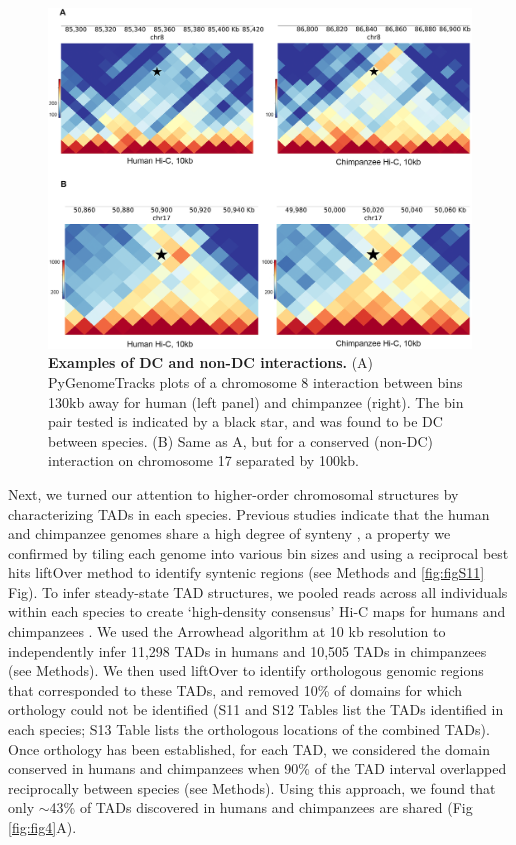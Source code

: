 \begin{figure}
\centering
\includegraphics[width=6in]{img/fig3.PNG}
\caption[Examples of DC and non-DC interactions.]{\textbf{Examples of DC and non-DC interactions.} (A) PyGenomeTracks plots \cite{Ramirez.2018} of a chromosome 8 interaction between bins 130kb away for human (left panel) and chimpanzee (right). The bin pair tested is indicated by a black star, and was found to be DC between species. (B) Same as A, but for a conserved (non-DC) interaction on chromosome 17 separated by 100kb.}
\label{fig:fig3}
\end{figure}

Next, we turned our attention to higher-order chromosomal structures by characterizing TADs in each species. Previous studies indicate that the human and chimpanzee genomes share a high degree of synteny \cite{Yunis.1982, Yunis.1980, Scally.2012, Kehrer-sawatzki.2007, Catacchio.2018, Lee.2016}, a property we confirmed by tiling each genome into various bin sizes and using a reciprocal best hits liftOver method to identify syntenic regions (see Methods and \ref{fig:figS11} Fig). To infer steady-state TAD structures, we pooled reads across all individuals within each species to create `high-density consensus' Hi-C maps for humans and chimpanzees \cite{Durand.2016}. We used the Arrowhead algorithm at 10 kb resolution \cite{Durand.2016} to independently infer 11,298 TADs in humans and 10,505 TADs in chimpanzees (see Methods). We then used liftOver to identify orthologous genomic regions that corresponded to these TADs, and removed 10\% of domains for which orthology could not be identified (S11 and S12 Tables list the TADs identified in each species; S13 Table lists the orthologous locations of the combined TADs). Once orthology has been established, for each TAD, we considered the domain conserved in humans and chimpanzees when 90\% of the TAD interval overlapped reciprocally between species (see Methods). Using this approach, we found that only $\sim$43\% of TADs discovered in humans and chimpanzees are shared (Fig \ref{fig:fig4}A).

